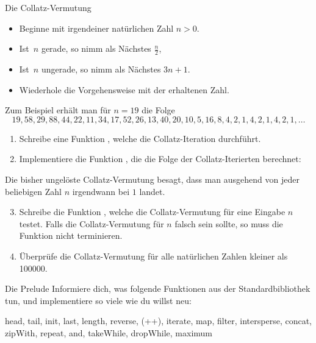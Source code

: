 \documentclass{uebblatt}
\begin{document}
\begin{aufgabe}{Die Collatz-Vermutung}
  \begin{itemize}
    \item Beginne mit irgendeiner natürlichen Zahl $n > 0$.
    \item Ist~$n$ gerade, so nimm als Nächstes $\tfrac{n}{2}$,
    \item Ist~$n$ ungerade, so nimm als Nächstes $3n + 1$.
    \item Wiederhole die Vorgehensweise mit der erhaltenen Zahl.
  \end{itemize}
  Zum Beispiel erhält man für $n=19$ die Folge
  \[ 19, 58, 29, 88, 44, 22, 11, 34, 17, 52, 26, 13, 40, 20, 10, 5, 16, 8, 4, 2, 1, 4, 2, 1, 4, 2, 1, \ldots \]
  \begin{enumerate}
    
    \item Schreibe eine Funktion , welche die Collatz-Iteration durchführt.
    \item Implementiere die Funktion , die die Folge der Collatz-Iterierten berechnet: 
  \end{enumerate}
  Die bisher ungelöste Collatz-Vermutung besagt, dass man ausgehend von jeder beliebigen Zahl $n$ irgendwann bei $1$ landet.
  \begin{enumerate}
    \setcounter{enumi}{2}
    \item Schreibe die Funktion , welche die Collatz-Vermutung für eine Eingabe $n$ testet. Falls die Collatz-Vermutung für $n$ falsch sein sollte, so muss die Funktion nicht terminieren.
    \item Überprüfe die Collatz-Vermutung für alle natürlichen Zahlen kleiner als 100000.
  \end{enumerate}
\end{aufgabe}

\begin{aufgabe}{Die Prelude}
  Informiere dich, was folgende Funktionen aus der Standardbibliothek tun, und implementiere so viele wie du willst neu:
  \begin{haskellcode}
head, tail, init, last, length, reverse, (++), iterate, map, filter,
intersperse, concat, zipWith, repeat, and, takeWhile, dropWhile, maximum
  \end{haskellcode}
\end{aufgabe}
\end{document}
